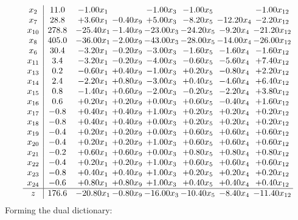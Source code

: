 \documentclass[8pt]{article}
\begin{document}
\[\begin{array}{c| c c@{\hskip 2pt} c@{\hskip 2pt} c@{\hskip 2pt} c@{\hskip 2pt} c@{\hskip 2pt} c@{\hskip 2pt} }
 x_{2}   &  11.0 & -1.00 x_{1} &   & -1.00 x_{3} & -1.00 x_{5} &   & -1.00 x_{12}\\
 x_{7}   &  28.8 & +  3.60 x_{1} & -0.40 x_{9} & +  5.00 x_{3} & -8.20 x_{5} & -12.20 x_{4} & -2.20 x_{12}\\
 x_{10}   &  278.8 & -25.40 x_{1} & -1.40 x_{9} & -23.00 x_{3} & -24.20 x_{5} & -9.20 x_{4} & -21.20 x_{12}\\
 x_{8}   &  405.0 & -36.00 x_{1} & -2.00 x_{9} & -43.00 x_{3} & -28.00 x_{5} & -14.00 x_{4} & -26.00 x_{12}\\
 x_{6}   &  30.4 & -3.20 x_{1} & -0.20 x_{9} & -3.00 x_{3} & -1.60 x_{5} & -1.60 x_{4} & -1.60 x_{12}\\
 x_{11}   &  3.4 & -3.20 x_{1} & -0.20 x_{9} & -4.00 x_{3} & -0.60 x_{5} & -5.60 x_{4} & +  7.40 x_{12}\\
 x_{13}   &  0.2 & -0.60 x_{1} & +  0.40 x_{9} & -1.00 x_{3} & +  0.20 x_{5} & -0.80 x_{4} & +  2.20 x_{12}\\
 x_{14}   &  2.4 & -2.20 x_{1} & +  0.80 x_{9} & -3.00 x_{3} & +  0.40 x_{5} & -4.60 x_{4} & +  6.40 x_{12}\\
 x_{15}   &  0.8 & -1.40 x_{1} & +  0.60 x_{9} & -2.00 x_{3} & -0.20 x_{5} & -2.20 x_{4} & +  3.80 x_{12}\\
 x_{16}   &  0.6 & +  0.20 x_{1} & +  0.20 x_{9} & +  0.00 x_{3} & +  0.60 x_{5} & -0.40 x_{4} & +  1.60 x_{12}\\
 x_{17}   &  -0.8 & +  0.40 x_{1} & +  0.40 x_{9} & +  1.00 x_{3} & +  0.20 x_{5} & +  0.20 x_{4} & +  0.20 x_{12}\\
 x_{18}   &  -0.8 & +  0.40 x_{1} & +  0.40 x_{9} & +  0.00 x_{3} & +  0.20 x_{5} & +  0.20 x_{4} & +  0.20 x_{12}\\
 x_{19}   &  -0.4 & +  0.20 x_{1} & +  0.20 x_{9} & +  0.00 x_{3} & +  0.60 x_{5} & +  0.60 x_{4} & +  0.60 x_{12}\\
 x_{20}   &  -0.4 & +  0.20 x_{1} & +  0.20 x_{9} & +  1.00 x_{3} & +  0.60 x_{5} & +  0.60 x_{4} & +  0.60 x_{12}\\
 x_{21}   &  -0.2 & +  0.60 x_{1} & +  0.60 x_{9} & +  0.00 x_{3} & +  0.80 x_{5} & +  0.80 x_{4} & +  0.80 x_{12}\\
 x_{22}   &  -0.4 & +  0.20 x_{1} & +  0.20 x_{9} & +  1.00 x_{3} & +  0.60 x_{5} & +  0.60 x_{4} & +  0.60 x_{12}\\
 x_{23}   &  -0.8 & +  0.40 x_{1} & +  0.40 x_{9} & +  1.00 x_{3} & +  0.20 x_{5} & +  0.20 x_{4} & +  0.20 x_{12}\\
 x_{24}   &  -0.6 & +  0.80 x_{1} & +  0.80 x_{9} & +  1.00 x_{3} & +  0.40 x_{5} & +  0.40 x_{4} & +  0.40 x_{12}\\
\hline
z    &  176.6 & -20.80 x_{1} & -0.80 x_{9} & -16.00 x_{3} & -10.40 x_{5} & -8.40 x_{4} & -11.40 x_{12}\\
\end{array}\]
Forming the dual dictionary:
\end{document}
